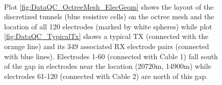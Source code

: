 \documentclass[final,authoryear,5p,times,twocolumn]{elsarticle}
\begin{document}
\begin{figure} [!ht]
    \begin{center}
     \\%
    \end{center}
\caption{Plot \ref{fig:DataQC_OctreeMesh_ElecGeom} shows the layout of the discretized tunnels (blue resistive cells) on the octree mesh and the location of all 120 electrodes (marked by white spheres) while plot \ref{fig:DataQC_TypicalTx} shows a typical TX (connected with the orange line) and its 349 associated RX electrode pairs (connected with blue lines). Electrodes 1-60 (connected with Cable 1) fall south of the gap in electrodes near the location (20720m, 14900m) while electrodes 61-120 (connected with Cable 2) are north of this gap.}
\label{fig:DataQC_Layout}
\end{figure}
\end{document}
